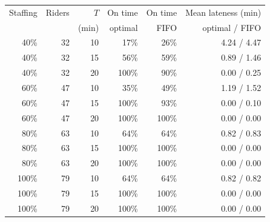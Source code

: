 \begin{tabular}{rrrrrr}
\toprule
Staffing & Riders & $T$ & On time & On time & Mean lateness (min) \\
 & & (min) & optimal & FIFO & optimal / FIFO \\
\midrule
40\% & 32 & 10 & 17\% & 26\% & 4.24 / 4.47 \\
40\% & 32 & 15 & 56\% & 59\% & 0.89 / 1.46 \\
40\% & 32 & 20 & 100\% & 90\% & 0.00 / 0.25 \\
60\% & 47 & 10 & 35\% & 49\% & 1.19 / 1.52 \\
60\% & 47 & 15 & 100\% & 93\% & 0.00 / 0.10 \\
60\% & 47 & 20 & 100\% & 100\% & 0.00 / 0.00 \\
80\% & 63 & 10 & 64\% & 64\% & 0.82 / 0.83 \\
80\% & 63 & 15 & 100\% & 100\% & 0.00 / 0.00 \\
80\% & 63 & 20 & 100\% & 100\% & 0.00 / 0.00 \\
100\% & 79 & 10 & 64\% & 64\% & 0.82 / 0.82 \\
100\% & 79 & 15 & 100\% & 100\% & 0.00 / 0.00 \\
100\% & 79 & 20 & 100\% & 100\% & 0.00 / 0.00 \\
\bottomrule
\end{tabular}
